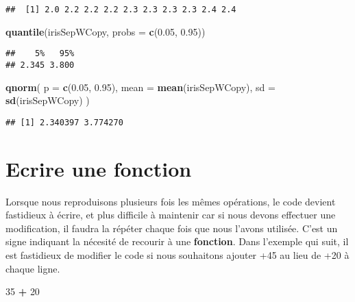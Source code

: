 \documentclass[]{book}
\newenvironment{Shaded}{\begin{snugshade}}{\end{snugshade}}
\newcommand{\KeywordTok}[1]{\textcolor[rgb]{0.13,0.29,0.53}{\textbf{#1}}}
\newcommand{\DataTypeTok}[1]{\textcolor[rgb]{0.13,0.29,0.53}{#1}}
\newcommand{\DecValTok}[1]{\textcolor[rgb]{0.00,0.00,0.81}{#1}}
\newcommand{\FloatTok}[1]{\textcolor[rgb]{0.00,0.00,0.81}{#1}}
\newcommand{\StringTok}[1]{\textcolor[rgb]{0.31,0.60,0.02}{#1}}
\newcommand{\OperatorTok}[1]{\textcolor[rgb]{0.81,0.36,0.00}{\textbf{#1}}}
\newcommand{\NormalTok}[1]{#1}
\theoremstyle{definition}
\theoremstyle{definition}
\theoremstyle{definition}
\theoremstyle{remark}
\begin{document}
\begin{verbatim}
##  [1] 2.0 2.2 2.2 2.2 2.3 2.3 2.3 2.3 2.4 2.4
\end{verbatim}

\begin{Shaded}
\begin{Highlighting}[]
\KeywordTok{quantile}\NormalTok{(irisSepWCopy, }\DataTypeTok{probs =} \KeywordTok{c}\NormalTok{(}\FloatTok{0.05}\NormalTok{, }\FloatTok{0.95}\NormalTok{))}
\end{Highlighting}
\end{Shaded}

\begin{verbatim}
##    5%   95% 
## 2.345 3.800
\end{verbatim}

\begin{Shaded}
\begin{Highlighting}[]
\KeywordTok{qnorm}\NormalTok{(}
  \DataTypeTok{p =} \KeywordTok{c}\NormalTok{(}\FloatTok{0.05}\NormalTok{, }\FloatTok{0.95}\NormalTok{), }
  \DataTypeTok{mean =} \KeywordTok{mean}\NormalTok{(irisSepWCopy), }
  \DataTypeTok{sd =} \KeywordTok{sd}\NormalTok{(irisSepWCopy)}
\NormalTok{)}
\end{Highlighting}
\end{Shaded}

\begin{verbatim}
## [1] 2.340397 3.774270
\end{verbatim}

\hypertarget{l015function}{\section{Ecrire une
fonction}\label{l015function}}

Lorsque nous reproduisons plusieurs fois les mêmes opérations, le code
devient fastidieux à écrire, et plus difficile à maintenir car si nous
devons effectuer une modification, il faudra la répéter chaque fois que
nous l'avons utilisée. C'est un signe indiquant la nécesité de recourir
à une \textbf{fonction}. Dans l'exemple qui suit, il est fastidieux de
modifier le code si nous souhaitons ajouter +45 au lieu de +20 à chaque
ligne.

\begin{Shaded}
\begin{Highlighting}[]
\DecValTok{35} \OperatorTok{+}\StringTok{ }\DecValTok{20}
\end{Highlighting}
\end{Shaded}
\end{document}
